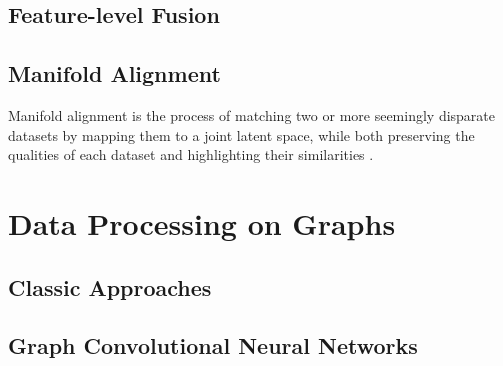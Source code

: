 	\subsection{Feature-level Fusion}
	
	\subsection{Manifold Alignment}
		Manifold alignment is the process of matching two or more seemingly disparate datasets by mapping them to a joint latent space, while both preserving the qualities of each dataset and highlighting their similarities \cite{Wang2011ManifoldAlignment,Liao2016ManAlignmentHSI,Stanley2019ManAlignmentFeatureCorrespondence}.  
	
%	
%	
%	
%	
	

\section{Data Processing on Graphs}

	\subsection{Classic Approaches}
	
	\subsection{Graph Convolutional Neural Networks}

